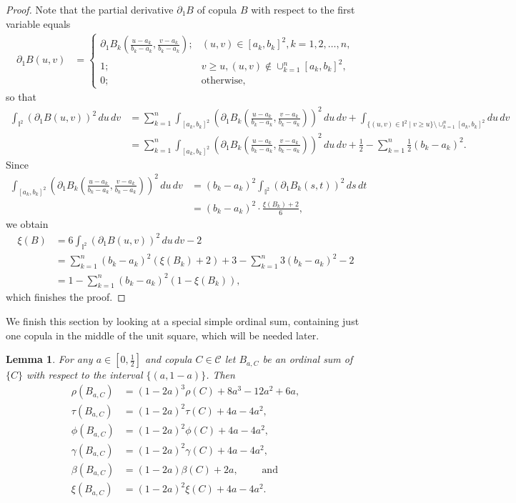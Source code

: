 \documentclass[12pt,a4paper]{amsart}
\newtheorem{lemma}[theorem]{Lemma}
\theoremstyle{definition}
\newcommand{\II}{\mathbb{I}}
\newcommand{\CC}{\mathcal{C}}
\begin{document}
\begin{proof}
Note that the partial derivative $\partial_1B$ of copula $B$ with respect to the first variable equals
\begin{align*}
\partial_1B(u,v) &= \begin{cases}
		\partial_1B_k(\frac{u-a_k}{b_k-a_k},\frac{v-a_k}{b_k-a_k}); & (u,v) \in [a_k, b_k]^2, k=1, 2, \dots, n,\\
		1; & v \ge u, (u,v) \notin \cup_{k=1}^n[a_k, b_k]^2, \\
		0; & \text{otherwise},
    \end{cases} 
\end{align*}
so that 
\begin{align*}
\int_{\II^2} (\partial_1B(u,v))^2 \, du\, dv &= \sum_{k=1}^n  \int_{[a_k, b_k]^2} (\partial_1B_k(\tfrac{u-a_k}{b_k-a_k},\tfrac{v-a_k}{b_k-a_k}))^2 \, du\, dv + \int_{\{(u,v) \in \II^2 \mid v \ge u\} \setminus \cup_{k=1}^n[a_k, b_k]^2} du\, dv \\
&= \sum_{k=1}^n  \int_{[a_k, b_k]^2} (\partial_1B_k(\tfrac{u-a_k}{b_k-a_k},\tfrac{v-a_k}{b_k-a_k}))^2 \, du\, dv + \tfrac12 - \sum_{k=1}^n \tfrac12(b_k - a_k)^2 .
\end{align*}
Since 
\begin{align*}
\int_{[a_k, b_k]^2} (\partial_1B_k(\tfrac{u-a_k}{b_k-a_k},\tfrac{v-a_k}{b_k-a_k}))^2 \, du\, dv &= (b_k - a_k)^2 \int_{\II^2} (\partial_1B_k(s,t))^2 \, ds\, dt \\
&= (b_k - a_k)^2 \cdot\frac{\xi(B_k)+2}{6},
\end{align*}
we obtain
\begin{align*}
\xi(B) &= 6\int_{\II^2} (\partial_1B(u,v))^2 \, du\, dv -2 \\
&= \sum_{k=1}^n (b_k - a_k)^2(\xi(B_k)+2) + 3 - \sum_{k=1}^n 3(b_k - a_k)^2 - 2 \\
&= 1 - \sum_{k=1}^n (b_k-a_k)^2(1-\xi(B_k)),
\end{align*}
which finishes the proof.
\end{proof}

We finish this section by looking at a special simple ordinal sum, containing just one copula in the middle of the unit square, which will be needed later.

\begin{lemma}\label{lem:ordinal}
For any $a \in [0,\tfrac12]$ and copula $C\in\CC$ let 
$B_{a,C}$ be an ordinal sum of $\{C\}$ with respect to the interval $\{(a, 1-a)\}$. Then 
\begin{align*}
   \rho(B_{a,C}) &=  (1-2a)^3\rho(C) + 8a^3 - 12a^2 + 6a, \\
   \tau(B_{a,C}) &=  (1-2a)^2\tau(C) + 4a - 4a^2, \\
   \phi(B_{a,C}) &= (1-2a)^2\phi(C) + 4a - 4a^2, \\
   \gamma(B_{a,C}) &=  (1-2a)^2\gamma(C) + 4a - 4a^2, \\
   \beta(B_{a,C}) &=  (1-2a)\beta(C) + 2a, \qquad  \text{ and} \\
   \xi(B_{a,C}) &= (1-2a)^2\xi(C) + 4a - 4a^2.
\end{align*}
\end{lemma}
\end{document}
